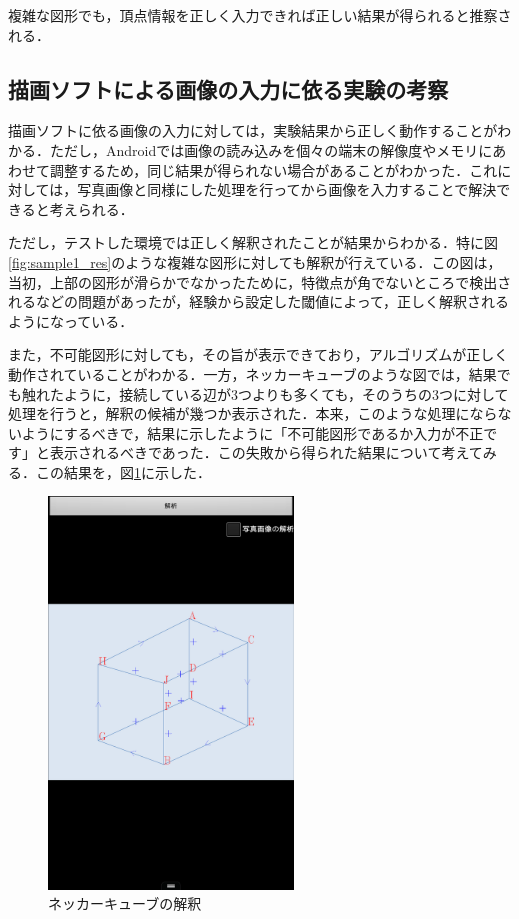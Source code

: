 \documentclass{jarticle}
\begin{document}
複雑な図形でも，頂点情報を正しく入力できれば正しい結果が得られると推察される．



\subsection{描画ソフトによる画像の入力に依る実験の考察}
描画ソフトに依る画像の入力に対しては，実験結果から正しく動作することがわかる．ただし，Androidでは画像の読み込みを個々の端末の解像度やメモリにあわせて調整するため，同じ結果が得られない場合があることがわかった．これに対しては，写真画像と同様にした処理を行ってから画像を入力することで解決できると考えられる．

ただし，テストした環境では正しく解釈されたことが結果からわかる．特に図\ref{fig:sample1_res}のような複雑な図形に対しても解釈が行えている．この図は，当初，上部の図形が滑らかでなかったために，特徴点が角でないところで検出されるなどの問題があったが，経験から設定した閾値によって，正しく解釈されるようになっている．

また，不可能図形に対しても，その旨が表示できており，アルゴリズムが正しく動作されていることがわかる．一方，ネッカーキューブのような図では，結果でも触れたように，接続している辺が3つよりも多くても，そのうちの3つに対して処理を行うと，解釈の候補が幾つか表示された．本来，このような処理にならないようにするべきで，結果に示したように「不可能図形であるか入力が不正です」と表示されるべきであった．この失敗から得られた結果について考えてみる．この結果を，図\ref{fig:necker}に示した．

\begin{figure}[H]
\begin{center}
\includegraphics[width=65mm]{../play_store/necker.png}
\caption{ネッカーキューブの解釈}
\label{fig:necker}
\end{center}
\end{figure}
\end{document}
